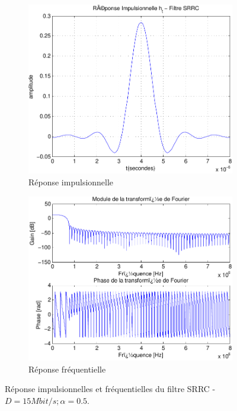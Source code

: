 \documentclass[a4paper,11pt]{article}
\begin{document}
\begin{figure}
	\begin{subfigure}{.5\textwidth}
  		\centering
  		\includegraphics[width=1\linewidth]{impul_srrc-crop.pdf}
  		\caption{Réponse impulsionnelle}
  		\label{fig:srrc_impul1M}
	\end{subfigure}
	\begin{subfigure}{.5\textwidth}
  		\centering
  		\includegraphics[width=1\linewidth]{frec_srrc-crop.pdf}
  		\caption{Réponse fréquentielle}
  		\label{fig:srrc_frec1M}
	\end{subfigure}%
	\caption{Réponse impulsionnelles et fréquentielles du filtre SRRC - $D=15 Mbit/s ; \alpha =0.5$.}
	\label{fig:srrc1M}
\end{figure} 
\end{document}

